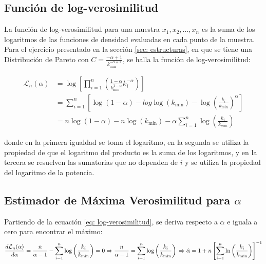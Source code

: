 \documentclass{article}
\begin{document}
\subsection{Función de log-verosimilitud}

La función de log-verosimilitud para una muestra $x_1, x_2, \ldots, x_n$ es la suma de los logaritmos de las funciones de densidad evaluadas en cada punto de la muestra. Para el ejercicio presentado en la sección \ref{sec: estructuras}, en que se tiene una Distribución de Pareto con $C = \frac{-\alpha+1}{k_{\text{min}}^{-\alpha+1}}$, se halla la función de log-verosimilitud:

\begin{align}
    \mathcal{L}_n(\alpha) & = \log \left[\prod_{i=1}^{n} \left( \frac{1-\alpha}{k_{\text{min}}^{1-\alpha}} k_i^{-\alpha} \right) \right] \nonumber               \\
                          & = \sum_{i=1}^{n} \left[ \log(1-\alpha) - log\log(k_{\text{min}}) - \log \left(\frac{k_i}{k_{min}} \right)^{\alpha} \right] \nonumber \\
                          & = n \log(1-\alpha) - n\log(k_{\text{min}}) - \alpha \sum_{i=1}^{n} \log\left(\frac{k_i}{k_{min}} \right)
\end{align}

donde en la primera igualdad se toma el logaritmo, en la segunda se utiliza la propiedad de que el logaritmo del producto es la suma de los logaritmos, y en la tercera se resuelven las sumatorias que no dependen de $i$ y se utiliza la propiedad del logaritmo de la potencia.

\subsection{Estimador de Máxima Verosimilitud para $\alpha$}

Partiendo de la ecuación \ref{eq: log-verosimilitud}, se deriva respecto a $\alpha$ e iguala a cero para encontrar el máximo:
$$
    \frac{d\mathcal{L}_n(\alpha)}{d\alpha} = \frac{n}{\alpha -1} - \sum_{i=1}^n \log \left(\frac{k_i}{k_\text{min}}\right) = 0 \\
    \Rightarrow \frac{n}{\alpha -1} = \sum_{i=1}^n \log \left(\frac{k_i}{k_\text{min}}\right) \\
    \Rightarrow \hat{\alpha} = 1 + n \left[ \sum_{i=1}^{n} \ln\left(\frac{k_i}{k_\text{min}}\right) \right]^{-1}
$$
\end{document}
